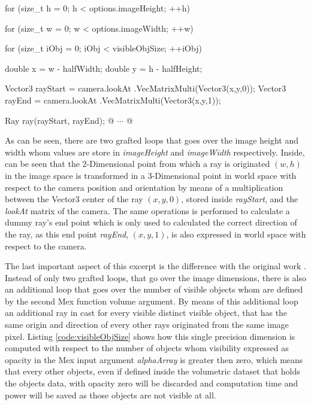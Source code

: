 \documentclass[12pt,a4paper]{extarticle}
\newcommand{\linespace}{\vspace{8pt}}
\begin{document}
\begin{cpp}[caption={Main loop in which a ray is created for each output image pixel, and which origin point is transformed from screen space $(w,h)$ to world space coordinates $(x_{1},y_{1},z_{1})$.},label=code:rayloop]
for (size_t h = 0; h < options.imageHeight; ++h) {
	for (size_t w = 0; w < options.imageWidth; ++w) {
		for (size_t iObj = 0; iObj < visibleObjSize; ++iObj) {
			double x = w - halfWidth;
			double y = h - halfHeight;

			Vector3 rayStart = camera.lookAt
									.VecMatrixMulti(Vector3(x,y,0));
			Vector3 rayEnd = camera.lookAt
									.VecMatrixMulti(Vector3(x,y,1));

			Ray ray(rayStart, rayEnd);
			@ $\cdots$ @
		}
	}
}
			
\end{cpp}

As can be seen, there are two grafted loops that goes over the image height and width whom values are store in \textit{imageHeight} and \textit{imageWidth} respectively. Inside, can be seen that the 2-Dimensional point from which a ray is originated $(w,h)$ in the image space is transformed in a 3-Dimensional point in world space with respect to the camera position and orientation by means of a multiplication between the Vector3 center of the ray $(x,y,0)$, stored inside \textit{rayStart}, and the \textit{lookAt } matrix of the camera. The same operations is performed to calculate a dummy ray's end point which is only used to calculated the correct direction of the ray, as this end point \textit{rayEnd}, $(x,y,1)$, is also expressed in world space with respect to the camera.
\linespace

The last important aspect of this excerpt is the difference with the original work \cite{levoy_1990:5}. Instead of only two grafted loops, that go over the image dimensions, there is also an additional loop that goes over the number of visible objects whom are defined by the second Mex function volume argument. By means of this additional loop an additional ray in cast for every visible distinct visible object, that has the same origin and direction of every other rays originated from the same image pixel. Listing \ref{code:visibleObjSize} shows how this single precision dimension is computed with respect to the number of objects whom visibility expressed as opacity in the Mex input argument \textit{alphaArray} is greater then zero, which means that every other objects, even if defined inside the volumetric dataset that holds the objects data, with opacity zero will be discarded and computation time and power will be saved as those objects are not visible at all.
\end{document}
